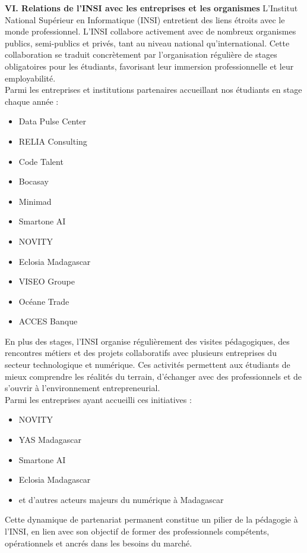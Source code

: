 \documentclass[a4paper,12pt]{article}
\begin{document}
\textbf{VI. Relations de l’INSI avec les entreprises et les organismes} 
L’Institut National Supérieur en Informatique (INSI) entretient des liens étroits avec le monde professionnel. L’INSI collabore activement avec de nombreux organismes publics, semi-publics et privés, tant au niveau national qu’international. Cette collaboration se traduit concrètement par l’organisation régulière de stages obligatoires pour les étudiants, favorisant leur immersion professionnelle et leur employabilité.\\

Parmi les entreprises et institutions partenaires accueillant nos étudiants en stage chaque année :
\begin{itemize}
    \item Data Pulse Center
    \item RELIA Consulting
    \item Code Talent
    \item Bocasay
    \item Minimad
    \item Smartone AI
    \item NOVITY
    \item Eclosia Madagascar
    \item VISEO Groupe
    \item Océane Trade
    \item ACCES Banque
\end{itemize}

En plus des stages, l’INSI organise régulièrement des visites pédagogiques, des rencontres métiers et des projets collaboratifs avec plusieurs entreprises du secteur technologique et numérique. Ces activités permettent aux étudiants de mieux comprendre les réalités du terrain, d’échanger avec des professionnels et de s’ouvrir à l’environnement entrepreneurial.\\

Parmi les entreprises ayant accueilli ces initiatives :
\begin{itemize}
    \item NOVITY
    \item YAS Madagascar
    \item Smartone AI
    \item Eclosia Madagascar
    \item et d'autres acteurs majeurs du numérique à Madagascar
\end{itemize}

Cette dynamique de partenariat permanent constitue un pilier de la pédagogie à l’INSI, en lien avec son objectif de former des professionnels compétents, opérationnels et ancrés dans les besoins du marché.\\
\end{document}
